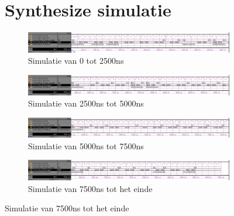 \begin{figure}[ht!]
\section{Synthesize simulatie}
\begin{figure}[ht!]
\includegraphics[width=\textwidth,height=\textheight,keepaspectratio]{Figuren/Controller/wave0-2_5_syn_inv.jpg}
\caption{Simulatie van 0 tot 2500ns}
\label{fig:sim_syn_0-2_5}
\end{figure}
\begin{figure}[ht!]
\includegraphics[width=\textwidth,height=\textheight,keepaspectratio]{Figuren/Controller/wave2_5-5_syn_inv.jpg}
\caption{Simulatie van 2500ns tot 5000ns}
\label{fig:sim_syn_2_5-5}
\end{figure}
\begin{figure}[ht!]
\includegraphics[width=\textwidth,height=\textheight,keepaspectratio]{Figuren/Controller/wave5-7_5_syn_inv.jpg}
\caption{Simulatie van 5000ns tot 7500ns}
\label{fig:sim_syn_5-7_5}
\end{figure}
\begin{figure}[ht!]
\includegraphics[width=\textwidth,height=\textheight,keepaspectratio]{Figuren/Controller/wave7_5-_syn_inv.jpg}
\caption{Simulatie van 7500ns tot het einde}
\label{fig:sim_syn_7_5-}
\end{figure}
\newpage

\end{figure}
